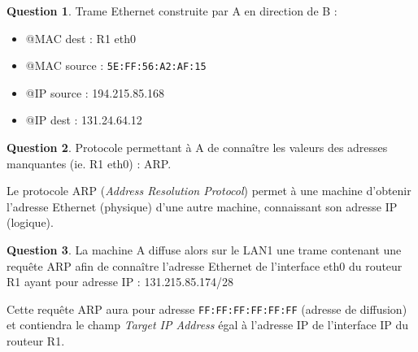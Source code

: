 \documentclass[11pt,english,french]{scrreprt}
\theoremstyle{remark}
\theoremstyle{definition}
\newtheorem{ques}{Question}[section]
\begin{document}
\begin{ques}
	Trame Ethernet construite par A en direction de B : \begin{itemize}
		\item @MAC dest : R1 eth0
		\item @MAC source : \lstinline!5E:FF:56:A2:AF:15!
		\item @IP source : 194.215.85.168
		\item @IP dest : 131.24.64.12
	\end{itemize}
\end{ques}

\begin{ques}
	Protocole permettant à A de connaître les valeurs des adresses manquantes (ie. R1 eth0) : ARP.
	
	Le protocole ARP (\emph{Address Resolution Protocol}) permet à une machine d'obtenir l'adresse Ethernet (physique) d'une autre machine, connaissant son adresse IP (logique).
\end{ques}

\begin{ques}
	La machine A diffuse alors sur le LAN1 une trame contenant une requête ARP afin de connaître l'adresse Ethernet de l'interface eth0 du routeur R1 ayant pour adresse IP : 131.215.85.174/28
	
	Cette requête ARP aura pour adresse \lstinline!FF:FF:FF:FF:FF:FF! (adresse de diffusion) et contiendra le champ \emph{Target IP Address} égal à l'adresse IP de l'interface IP du routeur R1.
\end{ques}
\end{document}
